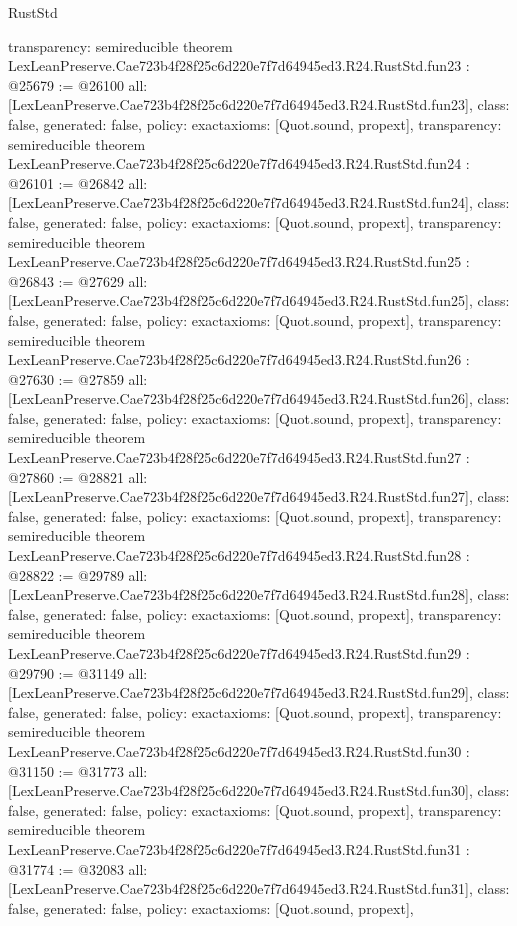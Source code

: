 \begin{lexlean}{RustStd}
\begin{coremodule}
{  transparency: semireducible
}
theorem LexLeanPreserve.Cae723b4f28f25c6d220e7f7d64945ed3.R24.RustStd.fun23 : @25679 := @26100 {
  all: [LexLeanPreserve.Cae723b4f28f25c6d220e7f7d64945ed3.R24.RustStd.fun23],
  class: false,
  generated: false,
  policy: exact{axioms: [Quot.sound, propext]},
  transparency: semireducible
}
theorem LexLeanPreserve.Cae723b4f28f25c6d220e7f7d64945ed3.R24.RustStd.fun24 : @26101 := @26842 {
  all: [LexLeanPreserve.Cae723b4f28f25c6d220e7f7d64945ed3.R24.RustStd.fun24],
  class: false,
  generated: false,
  policy: exact{axioms: [Quot.sound, propext]},
  transparency: semireducible
}
theorem LexLeanPreserve.Cae723b4f28f25c6d220e7f7d64945ed3.R24.RustStd.fun25 : @26843 := @27629 {
  all: [LexLeanPreserve.Cae723b4f28f25c6d220e7f7d64945ed3.R24.RustStd.fun25],
  class: false,
  generated: false,
  policy: exact{axioms: [Quot.sound, propext]},
  transparency: semireducible
}
theorem LexLeanPreserve.Cae723b4f28f25c6d220e7f7d64945ed3.R24.RustStd.fun26 : @27630 := @27859 {
  all: [LexLeanPreserve.Cae723b4f28f25c6d220e7f7d64945ed3.R24.RustStd.fun26],
  class: false,
  generated: false,
  policy: exact{axioms: [Quot.sound, propext]},
  transparency: semireducible
}
theorem LexLeanPreserve.Cae723b4f28f25c6d220e7f7d64945ed3.R24.RustStd.fun27 : @27860 := @28821 {
  all: [LexLeanPreserve.Cae723b4f28f25c6d220e7f7d64945ed3.R24.RustStd.fun27],
  class: false,
  generated: false,
  policy: exact{axioms: [Quot.sound, propext]},
  transparency: semireducible
}
theorem LexLeanPreserve.Cae723b4f28f25c6d220e7f7d64945ed3.R24.RustStd.fun28 : @28822 := @29789 {
  all: [LexLeanPreserve.Cae723b4f28f25c6d220e7f7d64945ed3.R24.RustStd.fun28],
  class: false,
  generated: false,
  policy: exact{axioms: [Quot.sound, propext]},
  transparency: semireducible
}
theorem LexLeanPreserve.Cae723b4f28f25c6d220e7f7d64945ed3.R24.RustStd.fun29 : @29790 := @31149 {
  all: [LexLeanPreserve.Cae723b4f28f25c6d220e7f7d64945ed3.R24.RustStd.fun29],
  class: false,
  generated: false,
  policy: exact{axioms: [Quot.sound, propext]},
  transparency: semireducible
}
theorem LexLeanPreserve.Cae723b4f28f25c6d220e7f7d64945ed3.R24.RustStd.fun30 : @31150 := @31773 {
  all: [LexLeanPreserve.Cae723b4f28f25c6d220e7f7d64945ed3.R24.RustStd.fun30],
  class: false,
  generated: false,
  policy: exact{axioms: [Quot.sound, propext]},
  transparency: semireducible
}
theorem LexLeanPreserve.Cae723b4f28f25c6d220e7f7d64945ed3.R24.RustStd.fun31 : @31774 := @32083 {
  all: [LexLeanPreserve.Cae723b4f28f25c6d220e7f7d64945ed3.R24.RustStd.fun31],
  class: false,
  generated: false,
  policy: exact{axioms: [Quot.sound, propext]},
}
\end{coremodule}
\end{lexlean}
